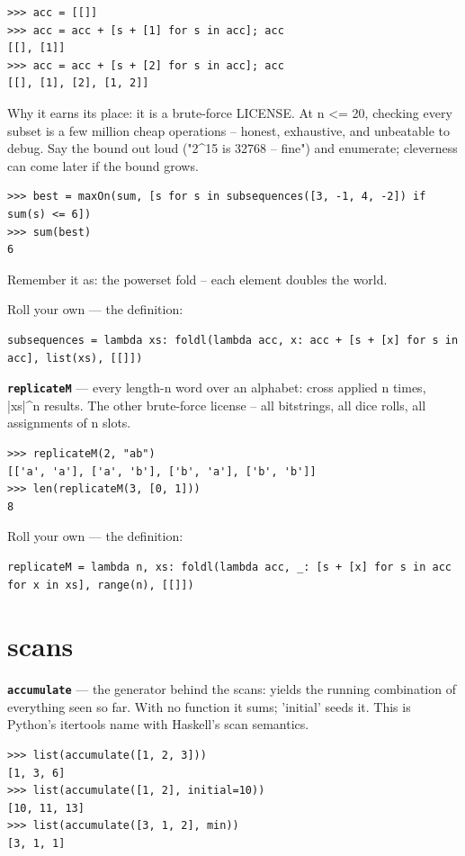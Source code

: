 \documentclass[10pt,letterpaper]{article}
\begin{document}
\begin{lstlisting}[style=ex]
>>> acc = [[]]
>>> acc = acc + [s + [1] for s in acc]; acc
[[], [1]]
>>> acc = acc + [s + [2] for s in acc]; acc
[[], [1], [2], [1, 2]]
\end{lstlisting}

Why it earns its place: it is a brute-force LICENSE. At n <= 20, checking every subset is a few million cheap operations -- honest, exhaustive, and unbeatable to debug. Say the bound out loud ("2\^{}15 is 32768 -- fine") and enumerate; cleverness can come later if the bound grows.

\begin{lstlisting}[style=ex]
>>> best = maxOn(sum, [s for s in subsequences([3, -1, 4, -2]) if sum(s) <= 6])
>>> sum(best)
6
\end{lstlisting}

Remember it as: the powerset fold -- each element doubles the world.


Roll your own --- the definition:

\begin{lstlisting}[style=ex]
subsequences = lambda xs: foldl(lambda acc, x: acc + [s + [x] for s in acc], list(xs), [[]])
\end{lstlisting}
\textbf{\texttt{replicateM}} --- every length-n word over an alphabet: cross applied n times, |xs|\^{}n results. The other brute-force license -- all bitstrings, all dice rolls, all assignments of n slots.
\begin{lstlisting}[style=ex]
>>> replicateM(2, "ab")
[['a', 'a'], ['a', 'b'], ['b', 'a'], ['b', 'b']]
>>> len(replicateM(3, [0, 1]))
8
\end{lstlisting}

Roll your own --- the definition:

\begin{lstlisting}[style=ex]
replicateM = lambda n, xs: foldl(lambda acc, _: [s + [x] for s in acc for x in xs], range(n), [[]])
\end{lstlisting}

\section{scans}
\textbf{\texttt{accumulate}} --- the generator behind the scans: yields the running combination of everything seen so far. With no function it sums; 'initial' seeds it. This is Python's itertools name with Haskell's scan semantics.
\begin{lstlisting}[style=ex]
>>> list(accumulate([1, 2, 3]))
[1, 3, 6]
>>> list(accumulate([1, 2], initial=10))
[10, 11, 13]
>>> list(accumulate([3, 1, 2], min))
[3, 1, 1]
\end{lstlisting}
\end{document}
